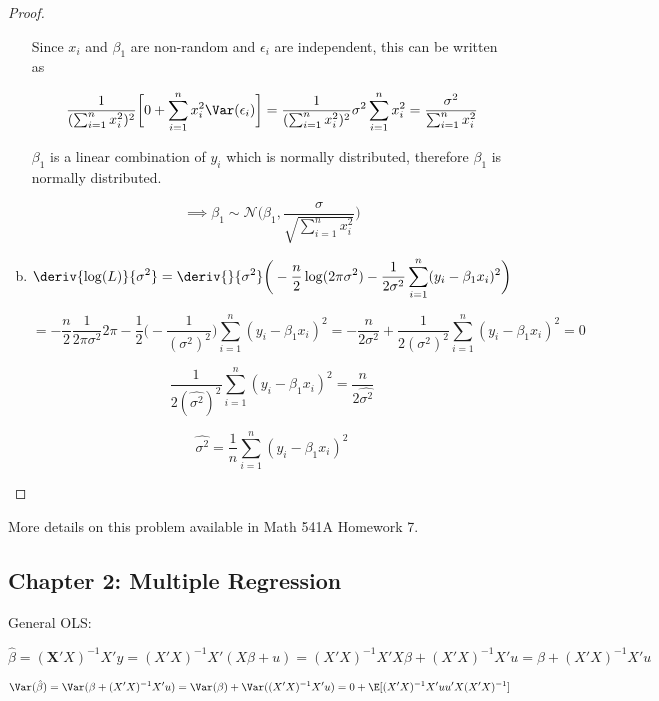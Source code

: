 \begin{proof}
\begin{enumerate}[(a)]
Since \(x_i\) and \(\beta_1\) are non-random and \(\epsilon_i\) are independent, this can be written as

\[
\frac{1}{(\sum_{i=1}^n x_i^2)^2} \bigg[0 + \sum_{i=1}^n x_i^2 \Var(\epsilon_i)  \bigg] =  \frac{1}{(\sum_{i=1}^n x_i^2)^2} \sigma^2 \sum_{i=1}^n x_i^2 = \frac{\sigma^2}{\sum_{i=1}^n x_i^2}
\]

\(\beta_1\) is a linear combination of \(y_i\) which is normally distributed, therefore \(\beta_1\) is normally distributed.

\[
\implies
\beta_1 \sim\mathcal{N}\bigg(\beta_1, \frac{\sigma}{\sqrt{\sum_{i=1}^n x_i^2}}\bigg)
\]

\item

\[
\deriv{\log(L)}{\sigma^2} = \deriv{}{\sigma^2} \bigg(  -\frac{n}{2} \log(2 \pi \sigma^2) -\frac{1}{2\sigma^2} \sum_{i=1}^n (y_i - \beta_1 x_i)^2  \bigg)
\]

\[
= -\frac{n}{2} \frac{1}{2 \pi \sigma^2} 2 \pi - \frac{1}{2} \bigg(- \frac{1}{(\sigma^2)^2} \bigg) \sum_{i=1}^n (y_i - \beta_1 x_i)^2 = -\frac{n}{2\sigma^2} + \frac{1}{2(\sigma^2)^2} \sum_{i=1}^n (y_i - \beta_1 x_i)^2 = 0
\]

\[
\frac{1}{2(\hat{\sigma^2})^2} \sum_{i=1}^n (y_i - \beta_1 x_i)^2  = \frac{n}{2\hat{\sigma^2}}
\]

\[
\hat{\sigma^2} = \frac{1}{n}\sum_{i=1}^n (y_i - \beta_1 x_i)^2 
\]

\end{enumerate}

\end{proof}

\begin{remark}More details on this problem available in Math 541A Homework 7.

\end{remark}

\subsection{Chapter 2: Multiple Regression}

General OLS:

\[
\hat{\beta} = (\boldsymbol{X}'X)^{-1}X'y = (X'X)^{-1}X'(X\beta + u) = (X'X)^{-1}X'X\beta + (X'X)^{-1}X'u  = \beta + (X'X)^{-1}X'u
\]

\[
\Var(\hat{\beta}) = \Var(\beta + (X'X)^{-1}X'u) = \Var(\beta) + \Var((X'X)^{-1}X' u) = 0 + \E[(X'X)^{-1}X' uu' X (X'X)^{-1} ] 
\]

